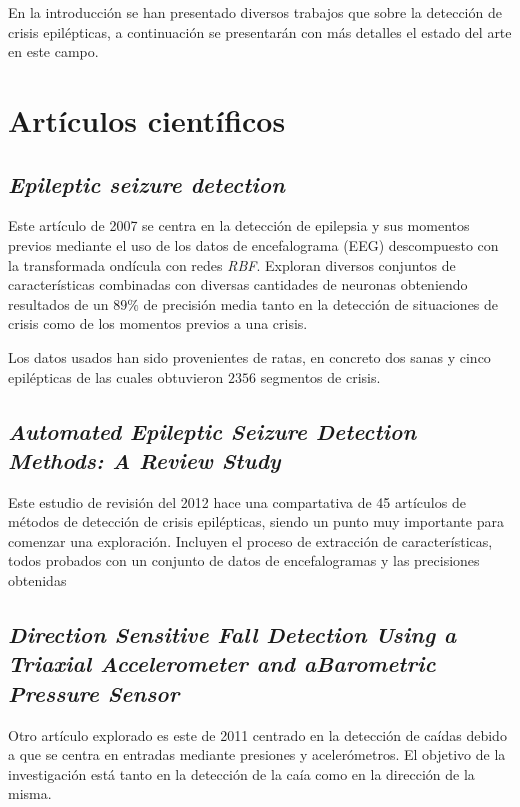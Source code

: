 
En la introducción se han presentado diversos trabajos que sobre la detección de crisis epilépticas, a continuación se presentarán con más detalles el estado del arte en este campo.

\section{Artículos científicos}\label{cap:trabrel}
\subsection{\textbf{\textit{Epileptic seizure detection}}~\cite{schuyler2007epileptic}}
Este artículo de 2007 se centra en la detección de epilepsia y sus momentos previos mediante el uso de los datos de encefalograma (EEG) descompuesto con la transformada ondícula con redes \textit{RBF}. Exploran diversos conjuntos de características combinadas con diversas cantidades de neuronas obteniendo resultados de un $89\%$ de precisión media tanto en la detección de situaciones de crisis como de los momentos previos a una crisis.

Los datos usados han sido provenientes de ratas, en concreto dos sanas y cinco epilépticas de las cuales obtuvieron $2356$ segmentos de crisis.

\subsection{\textbf{\textit{Automated Epileptic Seizure Detection Methods: A Review Study}}~\cite{tzallas2012review}}
Este estudio de revisión del 2012 hace una compartativa de 45 artículos de métodos de detección de crisis epilépticas, siendo un punto muy importante para comenzar una exploración. Incluyen el proceso de extracción de características, todos probados con un conjunto de datos de encefalogramas y las precisiones obtenidas

\subsection{\textbf{\textit{Direction  Sensitive  Fall  Detection  Using  a  Triaxial  Accelerometer  and  aBarometric  Pressure  Sensor}}~\cite{tolkiehn2011fall}}
Otro artículo explorado es este de 2011 centrado en la detección de caídas debido a que se centra en entradas mediante presiones y acelerómetros. El objetivo de la investigación está tanto en la detección de la caía como en la dirección de la misma. 

